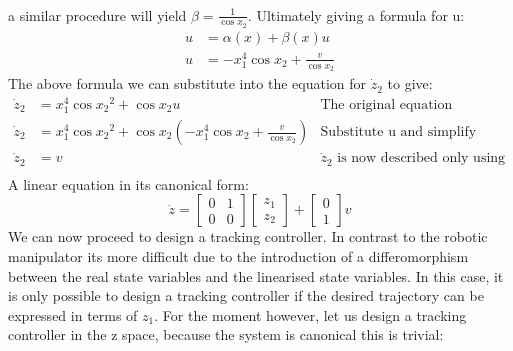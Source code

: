 {\begin{equation}
\begin{aligned}
             \end{aligned}
        \end{equation}
        a similar procedure will yield $\beta = \frac{1}{\cos{x_2}}$. Ultimately giving a formula for u:
        \begin{equation}
            \begin{aligned}
                u &= \alpha(x) + \beta(x)u\\
                u &= -x_1^{4}\cos{x_2} + \frac{v}{\cos{x_2}}
            \end{aligned}
        \end{equation}
        The above formula we can substitute into the equation for $\dot{z}_2$ to give:
        \begin{equation}
            \begin{aligned}
                \dot{z}_2&=x_1^{4}\cos{x_2}^{2} + \cos{x_2}u&\mbox{The original equation}\\[1.25ex]
                \dot{z}_2&=x_1^{4}\cos{x_2}^{2} + \cos{x_2}( -x_1^{4}\cos{x_2} + \frac{v}{\cos{x_2}} )&\mbox{Substitute u and simplify}\\[1.25ex]
                \dot{z}_2&=v&\mbox{$\dot{z}_2$ is now described only using the auxiliary input v }\\[1.25ex]
            \end{aligned}
        \end{equation}
        A linear equation in its canonical form:
        \begin{equation}
            \dot{z} = \begin{bmatrix}
                0 & 1    \\
                0 & 0
            \end{bmatrix}\begin{bmatrix}
                z_1  \\ z_2
            \end{bmatrix} + \begin{bmatrix}
                0   \\ 1
            \end{bmatrix} v
        \end{equation}
        We can now proceed to design a tracking controller. In contrast to the robotic manipulator its more difficult due to the introduction of a differomorphism between the real state variables and the linearised state variables. In this case, it is only possible to design a tracking controller if the desired trajectory can be expressed in terms of $z_1$. For the moment however, let us design a tracking controller in the z space, because the system is canonical this is trivial:
}
